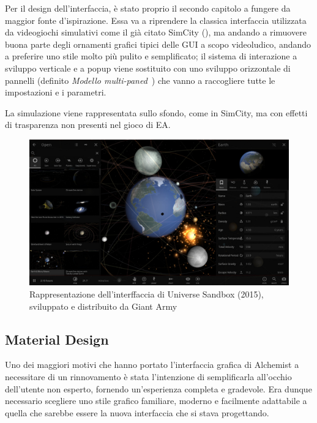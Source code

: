 
                Per il design dell'interfaccia, è stato proprio il secondo capitolo a fungere da maggior fonte d'ispirazione. Essa va a riprendere la classica interfaccia utilizzata da videogiochi simulativi come il già citato SimCity (), ma andando a rimuovere buona parte degli ornamenti grafici tipici delle GUI a scopo videoludico, andando a preferire uno stile molto più pulito e semplificato; il sistema di interazione a sviluppo verticale e a popup viene sostituito con uno sviluppo orizzontale di pannelli (definito \emph{Modello multi-paned}~\cite{multipanedmodel}) che vanno a raccogliere tutte le impostazioni e i parametri.

                La simulazione viene rappresentata sullo sfondo, come in SimCity, ma con effetti di trasparenza non presenti nel gioco di EA.


                \begin{figure}[htbp]
                    \centering
                    \includegraphics[scale=0.35]{img/universesandboxpanels}
                    \caption{Rappresentazione dell'interffaccia di Universe Sandbox (2015), sviluppato e distribuito da Giant Army}
                    \label{fig:universesandboxpanels}
                \end{figure}

        \subsection{Material Design}\label{sub:material}
            Uno dei maggiori motivi che hanno portato l'interfaccia grafica di Alchemist a necessitare di un rinnovamento è stata l'intenzione di semplificarla all'occhio dell'utente non esperto, fornendo un'esperienza completa e gradevole.
            Era dunque necessario scegliere uno stile grafico familiare, moderno e facilmente adattabile a quella che sarebbe essere la nuova interfaccia che si stava progettando.

